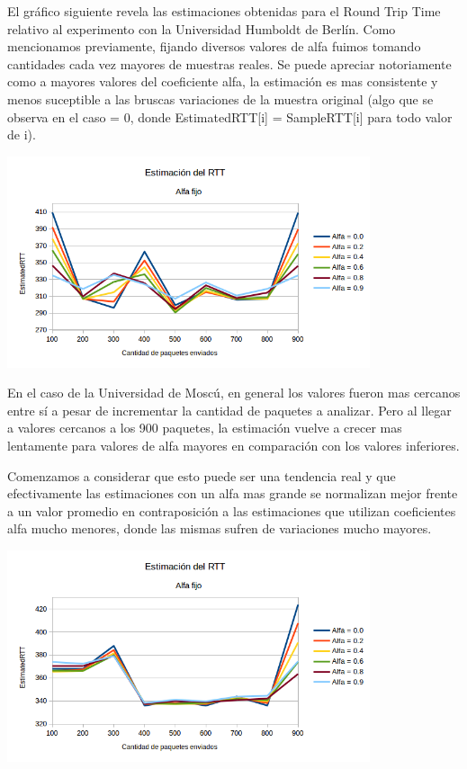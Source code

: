 El gráfico siguiente revela las estimaciones obtenidas para el Round Trip Time relativo al experimento con la Universidad Humboldt de Berlín. Como mencionamos previamente, fijando diversos valores de alfa fuimos tomando cantidades cada vez mayores de muestras reales. Se puede apreciar notoriamente como a mayores valores del coeficiente alfa, la estimación es mas consistente y menos suceptible a las bruscas variaciones de la muestra original (algo que se observa en el caso \alpha = 0, donde EstimatedRTT[i] = SampleRTT[i] para todo valor de i).

\centerline{\includegraphics[width=0.8\textwidth]{imagenes/3ra_parte/ping_varios_alfa_fijo_variando_n_alemania.png}}

En el caso de la Universidad de Moscú, en general los valores fueron mas cercanos entre sí a pesar de incrementar la cantidad de paquetes a analizar. Pero al llegar a valores cercanos a los 900 paquetes, la estimación vuelve a crecer mas lentamente para valores de alfa mayores en comparación con los valores inferiores. 

Comenzamos a considerar que esto puede ser una tendencia real y que efectivamente las estimaciones con un alfa mas grande se normalizan mejor frente a un valor promedio en contraposición a las estimaciones que utilizan coeficientes alfa mucho menores, donde las mismas sufren de variaciones mucho mayores.

\centerline{\includegraphics[width=0.8\textwidth]{imagenes/3ra_parte/ping_varios_alfa_fijo_variando_n_rusia.png}}

